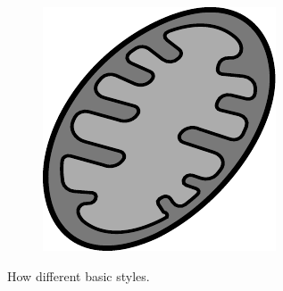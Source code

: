 \begin{figure}[h]
\begin{subfigure}[t]{0.2\linewidth}
    \end{subfigure}
    \begin{subfigure}[t]{0.2\linewidth}
        \includegraphics[width=\textwidth]{chapters/images/mitochondria-greyscale}
    \end{subfigure}
    \caption{How different basic styles.}
    \label{fig:basic-styles}
\end{figure}
